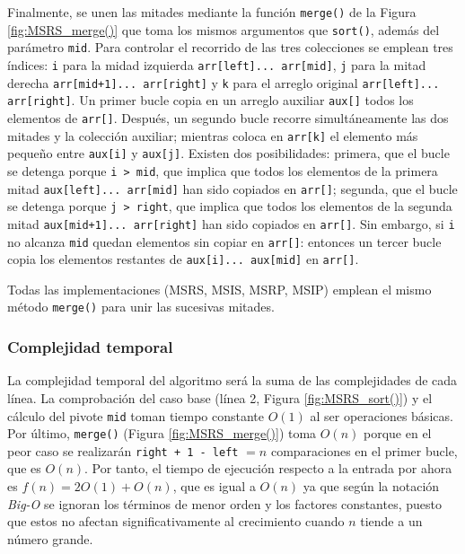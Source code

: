 \documentclass[titlepage]{article}
\begin{document}
Finalmente, se unen las mitades mediante la función \lstinline|merge()| de la Figura \ref{fig:MSRS_merge()} que toma los mismos argumentos que \lstinline|sort()|, además del parámetro \lstinline|mid|. Para controlar el recorrido de las tres colecciones se emplean tres índices: \lstinline|i| para la midad izquierda \lstinline|arr[left]... arr[mid]|, \lstinline|j| para la mitad derecha \lstinline|arr[mid+1]... arr[right]| y \lstinline|k| para el arreglo original \lstinline|arr[left]... arr[right]|. Un primer bucle copia en un arreglo auxiliar \lstinline|aux[]| todos los elementos de \lstinline|arr[]|. Después, un segundo bucle recorre simultáneamente las dos mitades y la colección auxiliar; mientras coloca en \lstinline|arr[k]| el elemento más pequeño entre \lstinline|aux[i]| y \lstinline|aux[j]|. Existen dos posibilidades: primera, que el bucle se detenga porque \lstinline|i > mid|, que implica que todos los elementos de la primera mitad \lstinline|aux[left]... arr[mid]| han sido copiados en \lstinline|arr[]|; segunda, que el bucle se detenga porque \lstinline|j > right|, que implica que todos los elementos de la segunda mitad \lstinline|aux[mid+1]... arr[right]| han sido copiados en \lstinline|arr[]|. Sin embargo, si \lstinline|i| no alcanza \lstinline|mid| quedan elementos sin copiar en \lstinline|arr[]|: entonces un tercer bucle copia los elementos restantes de \lstinline|aux[i]... aux[mid]| en \lstinline|arr[]|.

Todas las implementaciones (MSRS, MSIS, MSRP, MSIP) emplean el mismo método \lstinline|merge()| para unir las sucesivas mitades.

\subsubsection{Complejidad temporal}
La complejidad temporal del algoritmo será la suma de las complejidades de cada línea. La comprobación del caso base (línea 2, Figura \ref{fig:MSRS_sort()}) y el cálculo del pivote \lstinline|mid| toman tiempo constante \(O(1)\) al ser operaciones básicas. Por último, \lstinline|merge()| (Figura \ref{fig:MSRS_merge()}) toma \(O(n)\) porque en el peor caso se realizarán \lstinline|right + 1 - left| \(=n\) comparaciones en el primer bucle, que es \(O(n)\). Por tanto, el tiempo de ejecución respecto a la entrada por ahora es \(f(n) = 2O(1) + O(n)\), que es igual a \(O(n)\) ya que según la notación \textit{Big-O} se ignoran los términos de menor orden y los factores constantes, puesto que estos no afectan significativamente al crecimiento cuando \(n\) tiende a un número grande.
\end{document}
